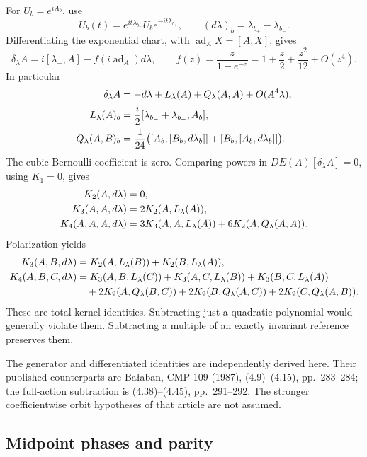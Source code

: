 \documentclass[11pt]{article}
\theoremstyle{remark}
\begin{document}
For \(U_b=e^{iA_b}\), use
\[
 U_b(t)=e^{it\lambda_{b_-}}U_be^{-it\lambda_{b_+}},
 \qquad (d\lambda)_b=\lambda_{b_+}-\lambda_{b_-}.
\]
Differentiating the exponential chart, with
\(\operatorname{ad}_A X=[A,X]\), gives
\begin{equation}
 \delta_\lambda A
 =i[\lambda_-,A]-f(i\operatorname{ad}_A)d\lambda,
 \qquad
 f(z)=\frac{z}{1-e^{-z}}
       =1+\frac z2+\frac{z^2}{12}+O(z^4).
 \label{tkw-generator}
\end{equation}
In particular
\begin{align}
 \delta_\lambda A
   &=-d\lambda+L_\lambda(A)+Q_\lambda(A,A)
                        +O(A^4\lambda),\notag\\
 L_\lambda(A)_b
   &=\frac i2[\lambda_{b_-}+\lambda_{b_+},A_b],\notag\\
 Q_\lambda(A,B)_b
   &=\frac1{24}\bigl(
      [A_b,[B_b,d\lambda_b]]+
      [B_b,[A_b,d\lambda_b]]\bigr).
 \label{tkw-LQ}
\end{align}
The cubic Bernoulli coefficient is zero. Comparing powers in
\(DE(A)[\delta_\lambda A]=0\), using \(K_1=0\), gives
\begin{align}
 K_2(A,d\lambda)&=0,\notag\\
 K_3(A,A,d\lambda)&=2K_2(A,L_\lambda(A)),\notag\\
 K_4(A,A,A,d\lambda)
   &=3K_3(A,A,L_\lambda(A))
       +6K_2(A,Q_\lambda(A,A)).
 \label{tkw-Ward-diagonal}
\end{align}
Polarization yields
\begin{align}
 K_3(A,B,d\lambda)
   &=K_2(A,L_\lambda(B))+K_2(B,L_\lambda(A)),\label{tkw-Ward-cubic}\\
 K_4(A,B,C,d\lambda)
   &=K_3(A,B,L_\lambda(C))
      +K_3(A,C,L_\lambda(B))
      +K_3(B,C,L_\lambda(A))\notag\\
   &\quad+2K_2(A,Q_\lambda(B,C))
      +2K_2(B,Q_\lambda(A,C))
      +2K_2(C,Q_\lambda(A,B)).
 \label{tkw-Ward-quartic}
\end{align}
These are total-kernel identities. Subtracting just a quadratic
polynomial would generally violate them. Subtracting a multiple
of an exactly invariant reference preserves them.

The generator and differentiated identities are independently
derived here. Their published counterparts are Ba{\l}aban,
CMP 109 (1987), (4.9)--(4.15), pp.~283--284; the full-action
subtraction is (4.38)--(4.45), pp.~291--292. The stronger
coefficientwise orbit hypotheses of that article are not assumed.

\subsection{Midpoint phases and parity}
\label{tkw-midpoint-section}
\end{document}
